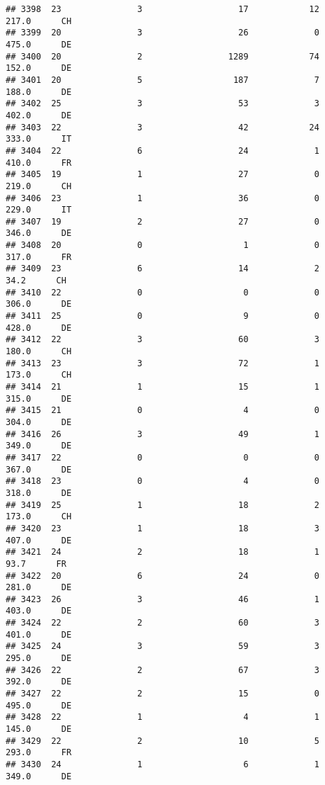\documentclass[
]{article}
\begin{document}
\begin{verbatim}
## 3398  23               3                   17            12    217.0      CH
## 3399  20               3                   26             0    475.0      DE
## 3400  20               2                 1289            74    152.0      DE
## 3401  20               5                  187             7    188.0      DE
## 3402  25               3                   53             3    402.0      DE
## 3403  22               3                   42            24    333.0      IT
## 3404  22               6                   24             1    410.0      FR
## 3405  19               1                   27             0    219.0      CH
## 3406  23               1                   36             0    229.0      IT
## 3407  19               2                   27             0    346.0      DE
## 3408  20               0                    1             0    317.0      FR
## 3409  23               6                   14             2     34.2      CH
## 3410  22               0                    0             0    306.0      DE
## 3411  25               0                    9             0    428.0      DE
## 3412  22               3                   60             3    180.0      CH
## 3413  23               3                   72             1    173.0      CH
## 3414  21               1                   15             1    315.0      DE
## 3415  21               0                    4             0    304.0      DE
## 3416  26               3                   49             1    349.0      DE
## 3417  22               0                    0             0    367.0      DE
## 3418  23               0                    4             0    318.0      DE
## 3419  25               1                   18             2    173.0      CH
## 3420  23               1                   18             3    407.0      DE
## 3421  24               2                   18             1     93.7      FR
## 3422  20               6                   24             0    281.0      DE
## 3423  26               3                   46             1    403.0      DE
## 3424  22               2                   60             3    401.0      DE
## 3425  24               3                   59             3    295.0      DE
## 3426  22               2                   67             3    392.0      DE
## 3427  22               2                   15             0    495.0      DE
## 3428  22               1                    4             1    145.0      DE
## 3429  22               2                   10             5    293.0      FR
## 3430  24               1                    6             1    349.0      DE

\end{verbatim}
\end{document}
